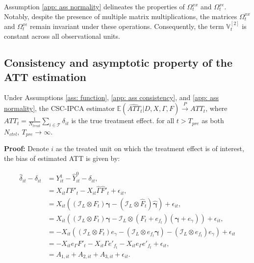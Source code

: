 \documentclass[12pt]{article}
\begin{document}
Assumption \ref{app: ass normality} delineates the properties of $\Omega_t^{xx}$ and $\Omega_t^{x\epsilon}$. Notably, despite the presence of multiple matrix multiplications, the matrices $\Omega_t^{xx}$ and $\Omega_t^{x\epsilon}$ remain invariant under these operations. Consequently, the term $\mathbb{V}_t^{[2]}$ is constant across all observational units.

\subsection{Consistency and asymptotic property of the ATT estimation}
\begin{theorem}
\label{thm: bias}
Under Assumptions \ref{ass: function}, \ref{app: ass consistency}, and \ref{app: ass normality}, the CSC-IPCA estimator $\mathbb{E}\left(\widehat{ATT}_{t} | D, X, \Gamma, F\right) \xrightarrow{P} ATT_{t}$, where $ATT_{t} = \frac{1}{N_{treat}}\sum_{i \in \mathcal{T}}\delta_{it}$ is the true treatment effect. for all $t > T_{pre}$ as both $N_{ctrl}, \ T_{pre} \to \infty$.
\end{theorem}

\textbf{Proof:} Denote $i$ as the treated unit on which the treatment effect is of interest, the bias of estimated ATT is given by:

\begin{equation*}
\begin{aligned}
\hat{\delta}_{it} - \delta_{it} &= Y_{it}^1 - \hat{Y}_{it}^0 - \delta_{it}, \\    
&= X_{it}\Gamma F'_t - X_{it}\hat{\Gamma}\hat{F}'_t + \epsilon_{it}, \\
&= X_{it}\left( \left(\mathcal{I}_L\otimes F_t \right) \bm{\gamma} - (\mathcal{I}_L\otimes \hat{F}_t ) \hat{\bm{\gamma}} \right) + \epsilon_{it}, \\
&= X_{it}\left( \left(\mathcal{I}_L\otimes F_t \right) \bm{\gamma} - \mathcal{I}_L\otimes (F_t + e_{f_t}) (\bm{\gamma}+ e_{\gamma}) \right) + \epsilon_{it}, \\
&= -X_{it}\left( (\mathcal{I}_L \otimes F_t) e_{\gamma} - (\mathcal{I}_L \otimes e_{f_t} \bm{\gamma}) - (\mathcal{I}_L \otimes e_{f_t}) e_{\gamma} \right) + \epsilon_{it}\\
&= -X_{it}e_{\Gamma} F'_t - X_{it}\Gamma e'_{f_t} - X_{it}e_{\Gamma} e'_{f_t} + \epsilon_{it}, \\
&= A_{1,it} + A_{2,it} + A_{3,it} + \epsilon_{it}.
\end{aligned}
\end{equation*}
\end{document}
